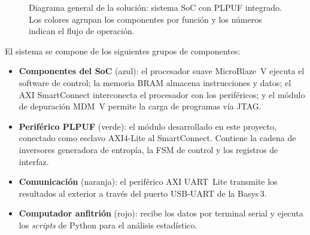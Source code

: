 \begin{figure}[htbp]
  \caption{Diagrama general de la solución: sistema SoC con PLPUF integrado.
    Los colores agrupan los componentes por función y los números indican el
    flujo de operación.}
  \label{fig:system_diagram}
\end{figure}

El sistema se compone de los siguientes grupos de componentes:

\begin{itemize}
  \item \textbf{Componentes del SoC} (\textcolor{blue!70}{azul}): el
    procesador suave MicroBlaze~V ejecuta el software de control; la memoria
    BRAM almacena instrucciones y datos; el AXI SmartConnect interconecta el
    procesador con los periféricos; y el módulo de depuración MDM~V permite
    la carga de programas vía JTAG.

  \item \textbf{Periférico PLPUF} (\textcolor{green!60!black}{verde}): el
    módulo desarrollado en este proyecto, conectado como esclavo AXI4-Lite al
    SmartConnect. Contiene la cadena de inversores generadora de entropía, la
    FSM de control y los registros de interfaz.

  \item \textbf{Comunicación} (\textcolor{orange!80!black}{naranja}): el
    periférico AXI UART~Lite transmite los resultados al exterior a través
    del puerto USB-UART de la Basys\,3.

  \item \textbf{Computador anfitrión} (\textcolor{red!60!black}{rojo}):
    recibe los datos por terminal serial y ejecuta los \textit{scripts} de
    Python para el análisis estadístico.
\end{itemize}

